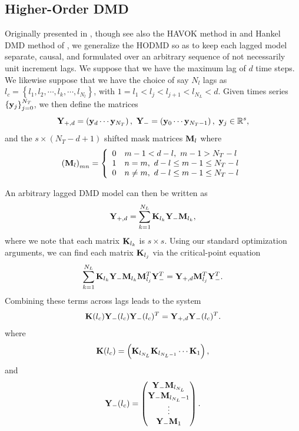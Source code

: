 \documentclass[a4paper,11pt]{article}
\newcommand{\ba}{\begin{array}}
\newcommand{\ea}{\end{array}}
\begin{document}
\subsection{Higher-Order DMD}

Originally presented in \cite{clainche}, though see also the HAVOK method in \cite{brunton_havok} and Hankel DMD method of \cite{arbabi}, we generalize the HODMD so as to keep each lagged model separate, causal, and formulated over an arbitrary sequence of not necessarily unit increment lags.  We suppose that we have the maximum lag of $d$ time steps.  We likewise suppose that we have the choice of say $N_{l}$ lags as $l_{c}=\left\{l_{1}, l_{2}, \cdots, l_{k}, \cdots, l_{N_{l}}\right\}$, with $1=l_{1} < l_{j} < l_{j+1} < l_{N_{L}}<d$.  Given times series $\left\{{\bf y}_{j}\right\}_{j=0}^{N_{T}}$, we then define the matrices 
\[
{\bf Y}_{+,d} = \left({\bf y}_{d} \cdots {\bf y}_{N_{T}}\right), ~ {\bf Y}_{-} = \left({\bf y}_{0} \cdots {\bf y}_{N_{T}-1}\right), ~ {\bf y}_{j}\in\mathbb{R}^{s},
\]  
and the $s\times (N_{T}-d+1)$ shifted mask matrices ${\bf M}_{l}$ where
\[
\left({\bf M}_{l}\right)_{mn} = \left\{
\ba{rl}
0 & m-1 < d-l, ~ m-1 > N_{T} - l\\
1 & n=m, ~ d-l\leq m-1 \leq N_{T} - l\\
0 & n\neq m, ~ d-l\leq m-1 \leq N_{T} - l
\ea
\right.
\]

An arbitrary lagged DMD model can then be written as 
\begin{equation}
{\bf Y}_{+,d} = \sum_{k=1}^{N_{L}}{\bf K}_{l_{k}}{\bf Y}_{-}{\bf M}_{l_{k}},
\label{basic_model}
\end{equation}
where we note that each matrix ${\bf K}_{l_{k}}$ is $s\times s$.  Using our standard optimization arguments, we can find each matrix ${\bf K}_{l_{j}}$ via the critical-point equation
\[
\sum_{k=1}^{N_{L}}{\bf K}_{l_{k}}{\bf Y}_{-}{\bf M}_{l_{k}}{\bf M}_{l_{j}}^{T}{\bf Y}_{-}^{T} = {\bf Y}_{+,d}{\bf M}_{l_{j}}^{T}{\bf Y}_{-}^{T}.
\]
Combining these terms across lags leads to the system 
\[
{\bf K}(l_{c}) {\bf Y}_{-}(l_{c}){\bf Y}_{-}(l_{c})^{T} = {\bf Y}_{+, d}{\bf Y}_{-}(l_{c})^{T}.
\]
where
\[
{\bf K}(l_{c}) = \left({\bf K}_{l_{N_{L}}} {\bf K}_{l_{N_{L}-1}} \cdots {\bf K}_{1}\right), 
\]
and
\[
{\bf Y}_{-}(l_{c}) = \begin{pmatrix} {\bf Y}_{-}{\bf M}_{l_{N_{L}}} \\ {\bf Y}_{-}{\bf M}_{l_{N_{L}}-1} \\ \vdots \\ {\bf Y}_{-}{\bf M}_{1} \end{pmatrix}.
\]
\end{document}
